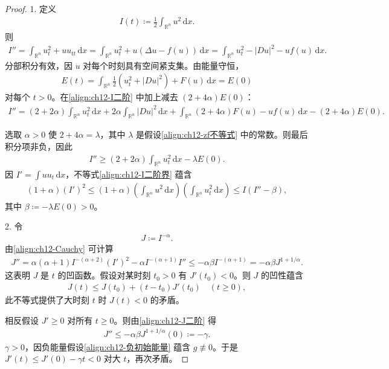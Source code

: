 \documentclass[../../main.tex]{subfiles}
\begin{document}
\begin{proof}
1. 定义
\begin{align*}
I(t)\coloneqq\frac{1}{2}\int_{\mathbb{R}^n}u^2\,\mathrm{d}x.
\end{align*}
则
\begin{align}
I''=\int_{\mathbb{R}^n}u_t^2+uu_{tt}\,\mathrm{d}x=\int_{\mathbb{R}^n}u_t^2+u(\Delta u-f(u))\,\mathrm{d}x=\int_{\mathbb{R}^n}u_t^2-|Du|^2-uf(u)\,\mathrm{d}x.
\label{align:ch12-I二阶}
\end{align}
分部积分有效，因 $u$ 对每个时刻具有空间紧支集。由能量守恒，
\begin{align*}
E(t)=\int_{\mathbb{R}^n}\frac{1}{2}(u_t^2+|Du|^2)+F(u)\,\mathrm{d}x=E(0)
\end{align*}
对每个 $t>0$。在\eqref{align:ch12-I二阶} 中加上减去 $(2+4\alpha)E(0)$：
\begin{align*}
I''=(2+2\alpha)\int_{\mathbb{R}^n}u_t^2\,\mathrm{d}x+2\alpha\int_{\mathbb{R}^n}|Du|^2\,\mathrm{d}x+\int_{\mathbb{R}^n}(2+4\alpha)F(u)-uf(u)\,\mathrm{d}x-(2+4\alpha)E(0).
\end{align*}

选取 $\alpha>0$ 使 $2+4\alpha=\lambda$，其中 $\lambda$ 是假设\eqref{align:ch12-zf不等式} 中的常数。则最后积分项非负，因此
\begin{align}
I''\geqslant(2+2\alpha)\int_{\mathbb{R}^n}u_t^2\,\mathrm{d}x-\lambda E(0).
\label{align:ch12-I二阶界}
\end{align}
因 $I'=\int uu_t\,\mathrm{d}x$，不等式\eqref{align:ch12-I二阶界} 蕴含
\begin{align}
(1+\alpha)(I')^2\leqslant(1+\alpha)\left(\int_{\mathbb{R}^n}u^2\,\mathrm{d}x\right)\left(\int_{\mathbb{R}^n}u_t^2\,\mathrm{d}x\right)\leqslant I(I''-\beta),
\label{align:ch12-Cauchy}
\end{align}
其中 $\beta\coloneqq-\lambda E(0)>0$。

2. 令
\begin{align*}
J\coloneqq I^{-\alpha}.
\end{align*}
由\eqref{align:ch12-Cauchy} 可计算
\begin{align}
J''=\alpha(\alpha+1)I^{-(\alpha+2)}(I')^2-\alpha I^{-(\alpha+1)}I''\leqslant-\alpha\beta I^{-(\alpha+1)}=-\alpha\beta J^{1+1/\alpha}.
\label{align:ch12-J二阶}
\end{align}
这表明 $J$ 是 $t$ 的凹函数。假设对某时刻 $t_0>0$ 有 $J'(t_0)<0$。则 $J$ 的凹性蕴含
\begin{align*}
J(t)\leqslant J(t_0)+(t-t_0)J'(t_0) \quad (t\geqslant 0),
\end{align*}
此不等式提供了大时刻 $t$ 时 $J(t)<0$ 的矛盾。

相反假设 $J'\geqslant 0$ 对所有 $t\geqslant 0$。则由\eqref{align:ch12-J二阶} 得
\begin{align*}
J''\leqslant-\alpha\beta J^{1+1/\alpha}(0)\coloneqq-\gamma.
\end{align*}
$\gamma>0$，因负能量假设\eqref{align:ch12-负初始能量} 蕴含 $g\not\equiv 0$。于是 $J'(t)\leqslant J'(0)-\gamma t<0$ 对大 $t$，再次矛盾。
\end{proof}
\end{document}
